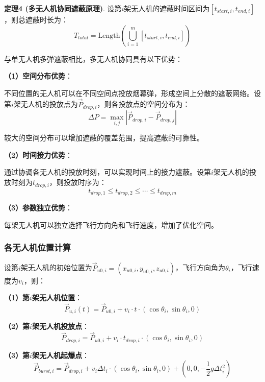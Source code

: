 \documentclass[12pt,a4paper]{article}
\begin{document}
\noindent\textbf{定理4 (多无人机协同遮蔽原理)}. 设第$i$架无人机的遮蔽时间区间为$[t_{start,i}, t_{end,i}]$，则总遮蔽时长为：
\begin{equation}
T_{total} = \text{Length}\left(\bigcup_{i=1}^{m} [t_{start,i}, t_{end,i}]\right)
\end{equation}

\indent 与单无人机多弹遮蔽相比，多无人机协同具有以下优势：

\noindent\textbf{（1）空间分布优势}：

\indent 不同位置的无人机可以在不同空间点投放烟幕弹，形成空间上分散的遮蔽网络。设第$i$架无人机的投放点为$\vec{P}_{drop,i}$，则各投放点的空间分布为：
\begin{equation}
\Delta P = \max_{i,j} |\vec{P}_{drop,i} - \vec{P}_{drop,j}|
\end{equation}

\indent 较大的空间分布可以增加遮蔽的覆盖范围，提高遮蔽的可靠性。

\noindent\textbf{（2）时间接力优势}：

\indent 通过协调各无人机的投放时刻，可以实现时间上的接力遮蔽。设第$i$架无人机的投放时刻为$t_{drop,i}$，则投放时序为：
\begin{equation}
t_{drop,1} \leq t_{drop,2} \leq \cdots \leq t_{drop,m}
\end{equation}

\noindent\textbf{（3）参数独立优势}：

\indent 每架无人机可以独立选择飞行方向角和飞行速度，增加了优化空间。

\subsubsection{各无人机位置计算}

\indent 设第$i$架无人机的初始位置为$\vec{P}_{u0,i} = (x_{u0,i}, y_{u0,i}, z_{u0,i})$，飞行方向角为$\theta_i$，飞行速度为$v_i$，则：

\noindent\textbf{（1）第$i$架无人机位置}：
\begin{equation}
\vec{P}_{u,i}(t) = \vec{P}_{u0,i} + v_i \cdot t \cdot (\cos\theta_i, \sin\theta_i, 0)
\end{equation}

\noindent\textbf{（2）第$i$架无人机投放点}：
\begin{equation}
\vec{P}_{drop,i} = \vec{P}_{u0,i} + v_i \cdot t_{drop,i} \cdot (\cos\theta_i, \sin\theta_i, 0)
\end{equation}

\noindent\textbf{（3）第$i$架无人机起爆点}：
\begin{equation}
\vec{P}_{burst,i} = \vec{P}_{drop,i} + v_i \Delta t_i \cdot (\cos\theta_i, \sin\theta_i, 0) + (0, 0, -\frac{1}{2}g\Delta t_i^2)
\end{equation}
\end{document}
